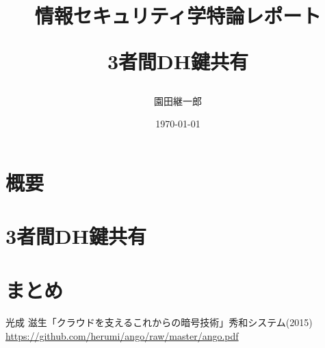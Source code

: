 \documentclass[a4paper,11pt]{jsarticle}
\begin{document}
\title{{\Large 情報セキュリティ学特論レポート}

3者間DH鍵共有}
\author{園田継一郎}
\date{\today}
\maketitle

\section{概要}

\section{3者間DH鍵共有}

\section{まとめ}

\begin{thebibliography}{99}
  光成 滋生「クラウドを支えるこれからの暗号技術」秀和システム(2015) \url{https://github.com/herumi/ango/raw/master/ango.pdf}
\end{thebibliography}
\end{document}

